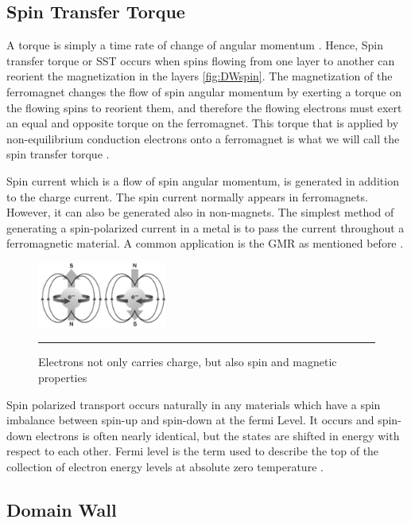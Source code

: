 \subsection{Spin Transfer Torque }

A torque is simply a time rate of change of angular momentum \cite{spintransfer}. Hence, Spin transfer torque or SST occurs when spins flowing from one layer to another can reorient the magnetization in the layers \ref{fig:DWspin}. The magnetization of the ferromagnet changes the flow of spin angular momentum by exerting a torque on the flowing spins to reorient them, and therefore the flowing electrons must exert an equal and opposite torque on the ferromagnet. This torque that is applied by non-equilibrium conduction electrons onto a ferromagnet is what we will call the spin transfer torque \cite{spintransfer}.

Spin current which is a flow of spin angular momentum, is generated in addition to the charge current. The spin current normally appears in ferromagnets. However, it can also be generated also in non-magnets. The simplest method of generating a spin-polarized current in a metal is to pass the current throughout a ferromagnetic material. A common application is the GMR as mentioned before \cite{handbookspin}.

\begin{figure}[htbp]
	\centering
		\includegraphics[width=0.38\textwidth]{Figures/electron.png}
		\rule{35em}{0.5pt}
	\caption[Electron carries spin, charge and magnetic]{Electrons not only carries charge, but also spin and magnetic properties }
	\label{fig:electron}
\end{figure}


Spin polarized transport occurs naturally in any materials which have a spin imbalance between spin-up and spin-down at the fermi Level. It occurs and spin-down electrons is often nearly identical, but the states are shifted in energy with respect to each other. Fermi level is the term used to describe the top of the collection of electron energy levels at absolute zero temperature \cite{handbookspin}.

\subsection{Domain Wall}

